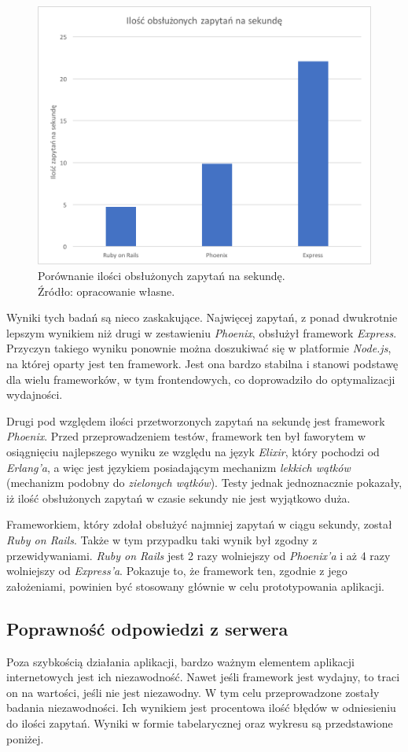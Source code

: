 \begin{figure}[h]
  \centering
  \includegraphics[width=0.7\linewidth]{images/rps}
  \caption{Porównanie ilości obsłużonych zapytań na sekundę.\\Źródło: opracowanie własne.}
  \label{fig:rps}
\end{figure}

Wyniki tych badań są nieco zaskakujące. Najwięcej zapytań, z ponad dwukrotnie lepszym wynikiem niż drugi w zestawieniu \emph{Phoenix}, obsłużył framework \emph{Express}. Przyczyn takiego wyniku ponownie można doszukiwać się w platformie \emph{Node.js}, na której oparty jest ten framework. Jest ona bardzo stabilna i stanowi podstawę dla wielu frameworków, w tym frontendowych, co doprowadziło do optymalizacji wydajności.

Drugi pod względem ilości przetworzonych zapytań na sekundę jest framework \emph{Phoenix}. Przed przeprowadzeniem testów, framework ten był faworytem w osiągnięciu najlepszego wyniku ze względu na język \emph{Elixir}, który pochodzi od \emph{Erlang'a}, a więc jest językiem posiadającym mechanizm \emph{lekkich wątków} (mechanizm podobny do \emph{zielonych wątków}). Testy jednak jednoznacznie pokazały, iż ilość obsłużonych zapytań w czasie sekundy nie jest wyjątkowo duża.

Frameworkiem, który zdołał obsłużyć najmniej zapytań w ciągu sekundy, został \emph{Ruby on Rails}. Także w tym przypadku taki wynik był zgodny z przewidywaniami. \emph{Ruby on Rails} jest 2 razy wolniejszy od \emph{Phoenix'a} i aż 4 razy wolniejszy od \emph{Express'a}. Pokazuje to, że framework ten, zgodnie z jego założeniami, powinien być stosowany głównie w celu prototypowania aplikacji.

\subsection{Poprawność odpowiedzi z serwera}
Poza szybkością działania aplikacji, bardzo ważnym elementem aplikacji internetowych jest ich niezawodność. Nawet jeśli framework jest wydajny, to traci on na wartości, jeśli nie jest niezawodny. W tym celu przeprowadzone zostały badania niezawodności. Ich wynikiem jest procentowa ilość błędów w odniesieniu do ilości zapytań. Wyniki w formie tabelarycznej oraz wykresu są przedstawione poniżej.

